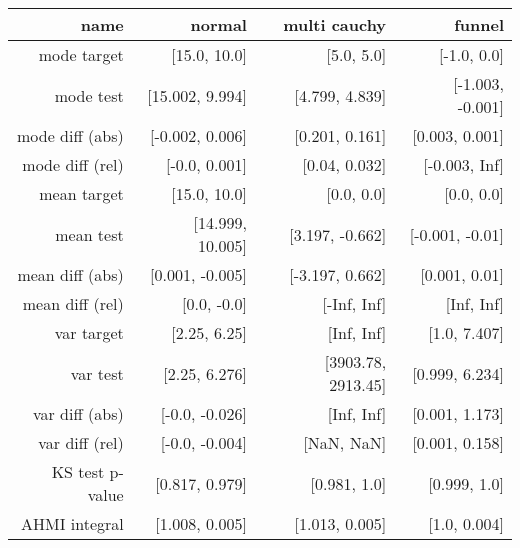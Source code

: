\begin{table}
  \begin{tabular}{rrrr}
    \hline\hline
    \textbf{name} & \textbf{normal} & \textbf{multi cauchy} & \textbf{funnel} \\\hline
    mode target & [15.0, 10.0] & [5.0, 5.0] & [-1.0, 0.0] \\
    mode test & [15.002, 9.994] & [4.799, 4.839] & [-1.003, -0.001] \\
    mode diff (abs) & [-0.002, 0.006] & [0.201, 0.161] & [0.003, 0.001] \\
    mode diff (rel) & [-0.0, 0.001] & [0.04, 0.032] & [-0.003, Inf] \\
    mean target & [15.0, 10.0] & [0.0, 0.0] & [0.0, 0.0] \\
    mean test & [14.999, 10.005] & [3.197, -0.662] & [-0.001, -0.01] \\
    mean diff (abs) & [0.001, -0.005] & [-3.197, 0.662] & [0.001, 0.01] \\
    mean diff (rel) & [0.0, -0.0] & [-Inf, Inf] & [Inf, Inf] \\
    var target & [2.25, 6.25] & [Inf, Inf] & [1.0, 7.407] \\
    var test & [2.25, 6.276] & [3903.78, 2913.45] & [0.999, 6.234] \\
    var diff (abs) & [-0.0, -0.026] & [Inf, Inf] & [0.001, 1.173] \\
    var diff (rel) & [-0.0, -0.004] & [NaN, NaN] & [0.001, 0.158] \\
    KS test p-value & [0.817, 0.979] & [0.981, 1.0] & [0.999, 1.0] \\
    AHMI integral & [1.008, 0.005] & [1.013, 0.005] & [1.0, 0.004] \\\hline\hline
  \end{tabular}
\end{table}
